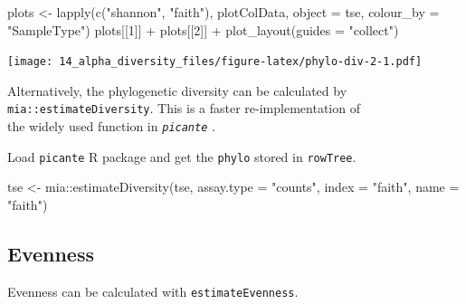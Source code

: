 \documentclass[
]{book}
\newenvironment{Shaded}{\begin{snugshade}}{\end{snugshade}}
\newcommand{\AttributeTok}[1]{\textcolor[rgb]{0.77,0.63,0.00}{#1}}
\newcommand{\DecValTok}[1]{\textcolor[rgb]{0.00,0.00,0.81}{#1}}
\newcommand{\FunctionTok}[1]{\textcolor[rgb]{0.00,0.00,0.00}{#1}}
\newcommand{\NormalTok}[1]{#1}
\newcommand{\OtherTok}[1]{\textcolor[rgb]{0.56,0.35,0.01}{#1}}
\newcommand{\SpecialCharTok}[1]{\textcolor[rgb]{0.00,0.00,0.00}{#1}}
\newcommand{\StringTok}[1]{\textcolor[rgb]{0.31,0.60,0.02}{#1}}
\begin{document}
\begin{Shaded}
\begin{Highlighting}[]
\NormalTok{plots }\OtherTok{\textless{}{-}} \FunctionTok{lapply}\NormalTok{(}\FunctionTok{c}\NormalTok{(}\StringTok{"shannon"}\NormalTok{, }\StringTok{"faith"}\NormalTok{),}
\NormalTok{                plotColData,}
                \AttributeTok{object =}\NormalTok{ tse, }\AttributeTok{colour\_by =} \StringTok{"SampleType"}\NormalTok{)}
\NormalTok{plots[[}\DecValTok{1}\NormalTok{]] }\SpecialCharTok{+}\NormalTok{ plots[[}\DecValTok{2}\NormalTok{]] }\SpecialCharTok{+}
  \FunctionTok{plot\_layout}\NormalTok{(}\AttributeTok{guides =} \StringTok{"collect"}\NormalTok{)}
\end{Highlighting}
\end{Shaded}

\texttt{[image: 14\_alpha\_diversity\_files/figure-latex/phylo-div-2-1.pdf]}

Alternatively, the phylogenetic diversity can be calculated by \texttt{mia::estimateDiversity}. This is a faster re-implementation of\\
the widely used function in \emph{\texttt{picante}} \citep[\citet{Kembel2010}]{R_picante}.

Load \texttt{picante} R package and get the \texttt{phylo} stored in \texttt{rowTree}.

\begin{Shaded}
\begin{Highlighting}[]
\NormalTok{tse }\OtherTok{\textless{}{-}}\NormalTok{ mia}\SpecialCharTok{::}\FunctionTok{estimateDiversity}\NormalTok{(tse, }
                              \AttributeTok{assay.type =} \StringTok{"counts"}\NormalTok{,}
                              \AttributeTok{index =} \StringTok{"faith"}\NormalTok{, }
                              \AttributeTok{name =} \StringTok{"faith"}\NormalTok{)}
\end{Highlighting}
\end{Shaded}

\hypertarget{evenness}{%
\subsection{Evenness}\label{evenness}}

Evenness can be calculated with \texttt{estimateEvenness}.

\begin{Shaded}
\end{Shaded}
\end{document}
